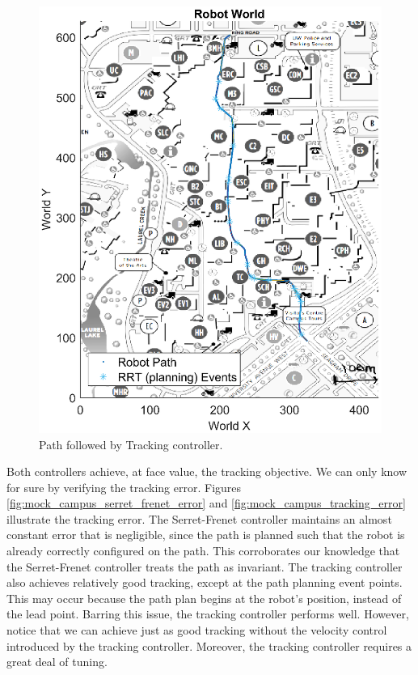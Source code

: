 \begin{figure}[!htbp]
    \centering
    \includegraphics{images/campus_tracking.eps}
    \caption{Path followed by Tracking controller.}
    \label{fig:mock_campus_tracking}
\end{figure}
Both controllers achieve, at face value, the tracking objective. We can only know for sure by verifying the tracking error. Figures \ref{fig:mock_campus_serret_frenet_error} and \ref{fig:mock_campus_tracking_error} illustrate the tracking error. The Serret-Frenet controller maintains an almost constant error that is negligible, since the path is planned such that the robot is already correctly configured on the path. This corroborates our knowledge that the Serret-Frenet controller treats the path as invariant. The tracking controller also achieves relatively good tracking, except at the path planning event points. This may occur because the path plan begins at the robot's position, instead of the lead point. Barring this issue, the tracking controller performs well. However, notice that we can achieve just as good tracking without the velocity control introduced by the tracking controller. Moreover, the tracking controller requires a great deal of tuning.
